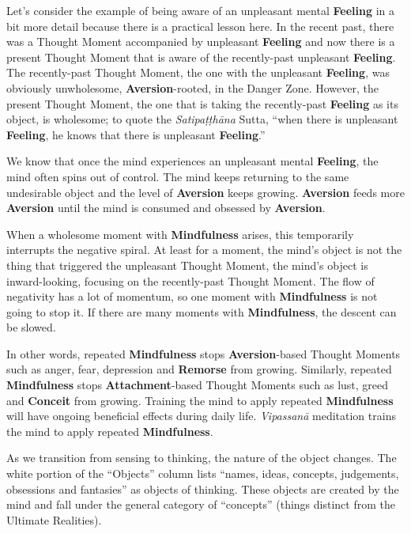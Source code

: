 Let’s consider the example of being aware of an unpleasant mental \textbf{Feeling} in a bit more detail because there is a practical lesson here. In the recent past, there was a Thought Moment accompanied by unpleasant \textbf{Feeling} and now there is a present Thought Moment that is aware of the recently-past unpleasant \textbf{Feeling}. The recently-past Thought Moment, the one with the unpleasant \textbf{Feeling}, was obviously unwholesome, \textbf{Aversion}-rooted, in the Danger Zone. However, the present Thought Moment, the one that is taking the recently-past \textbf{Feeling} as its object, is wholesome; to quote the \textit{Satipaṭṭhāna} Sutta, “when there is unpleasant \textbf{Feeling}, he knows that there is unpleasant \textbf{Feeling}.”

We know that once the mind experiences an unpleasant mental \textbf{Feeling}, the mind often spins out of control. The mind keeps returning to the same undesirable object and the level of \textbf{Aversion} keeps growing. \textbf{Aversion} feeds more \textbf{Aversion} until the mind is consumed and obsessed by \textbf{Aversion}.

When a wholesome moment with \textbf{Mindfulness} arises, this temporarily interrupts the negative spiral. At least for a moment, the mind’s object is not the thing that triggered the unpleasant Thought Moment, the mind’s object is inward-looking, focusing on the recently-past Thought Moment. The flow of negativity has a lot of momentum, so one moment with \textbf{Mindfulness} is not going to stop it. If there are many moments with \textbf{Mindfulness}, the descent can be slowed.

In other words, repeated \textbf{Mindfulness} stops \textbf{Aversion}-based Thought Moments such as anger, fear, depression and \textbf{Remorse} from growing. Similarly, repeated \textbf{Mindfulness} stops \textbf{Attachment}-based Thought Moments such as lust, greed and \textbf{Conceit} from growing. Training the mind to apply repeated \textbf{Mindfulness} will have ongoing beneficial effects during daily life. \textit{Vipassanā} meditation trains the mind to apply repeated \textbf{Mindfulness}.

As we transition from sensing to thinking, the nature of the object changes. The white portion of the “Objects” column lists “names, ideas, concepts, judgements, obsessions and fantasies” as objects of thinking. These objects are created by the mind and fall under the general category of “concepts” (things distinct from the Ultimate Realities).

